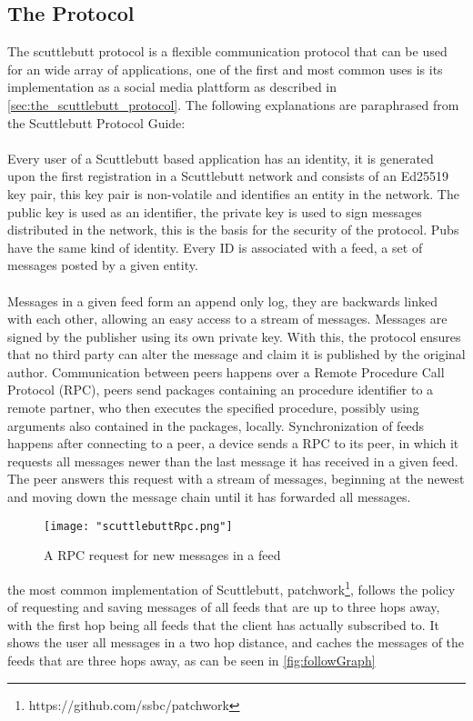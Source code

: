 \subsection{The Protocol}
\label{sec:scuttlebutt_protocol_detailed}
The scuttlebutt protocol is a flexible communication protocol that can be used for an wide array of applications, one of the first and most common uses is its implementation as a social media plattform as described in \ref{sec:the_scuttlebutt_protocol}. The following explanations are paraphrased from the Scuttlebutt Protocol Guide\cite{ScuttlebuttProtocol}:
\\
\\
Every user of a Scuttlebutt based application has an identity, it is generated upon the first registration in a Scuttlebutt network and consists of an Ed25519 key pair, this key pair is non-volatile and identifies an entity in the network. The public key is used as an identifier, the private key is used to sign messages distributed in the network, this is the basis for the security of the protocol. Pubs have the same kind of identity. Every ID is associated with a feed, a set of messages posted by a given entity. 
\\
\\
Messages in a given feed form an append only log, they are backwards linked with each other, allowing an easy access to a stream of messages. Messages are signed by the publisher using its own private key. With this, the protocol ensures that no third party can alter the message and claim it is published by the original author. Communication between peers happens over a Remote Procedure Call Protocol (RPC), peers send packages containing an procedure identifier to a remote partner, who then executes the specified procedure, possibly using arguments also contained in the packages, locally. Synchronization of feeds happens after connecting to a peer, a device sends a RPC to its peer, in which it requests all messages newer than the last message it has received in a given feed. The peer answers this request with a stream of messages, beginning at the newest and moving down the message chain until it has forwarded all messages.
\\
\begin{figure}[!h]
	\centering
	\texttt{[image: "scuttlebuttRpc.png"]}
	\caption{A RPC request for new messages in a feed\cite{ScuttlebuttProtocol}}
	\label{fig:rpcRequest}
\end{figure}

the most common implementation of Scuttlebutt, patchwork\footnote{https://github.com/ssbc/patchwork}, follows the policy of requesting and saving messages of all feeds that are up to three hops away, with the first hop being all feeds that the client has actually subscribed to. It shows the user all messages in a two hop distance, and caches the messages of the feeds that are three hops away, as can be seen in \ref{fig:followGraph}
\clearpage

